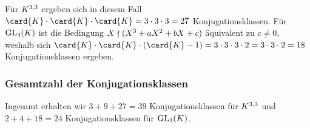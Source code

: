 Für $\matrices{3}{K}$ ergeben sich in diesem Fall $\card{K} \cdot \card{K} \cdot \card{K} = 3 \cdot 3 \cdot 3 = 27$ Konjugationsklassen.
Für $\GL{3}{K}$ ist die Bedingung $X \notdivides (X^3 + a X^2 + b X + c)$ äquivalent zu $c \neq 0$, weshalb sich $\card{K} \cdot \card{K} \cdot (\card{K} - 1) = 3 \cdot 3 \cdot 3 \cdot 2 = 3 \cdot 3 \cdot 2 = 18$ Konjugationsklassen ergeben.



\subsubsection*{Gesamtzahl der Konjugationsklassen}

Ingesamt erhalten wir $3 + 9 + 27 = 39$ Konjugationsklassen für $\matrices{3}{K}$ und $2 + 4 + 18 = 24$ Konjugationsklassen für $\GL{3}{K}$.





\subsection{}

